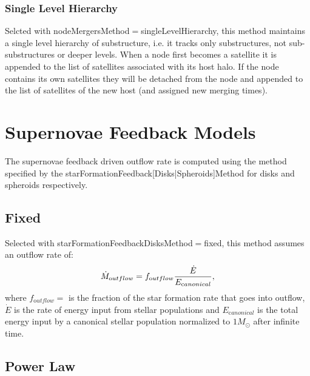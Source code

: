 \subsubsection{Single Level Hierarchy}

Selcted with {\normalfont \ttfamily nodeMergersMethod}$=${\normalfont \ttfamily singleLevelHierarchy}, this method maintains a single level hierarchy of substructure, i.e. it tracks only substructures, not sub-substructures or deeper levels. When a \gls{node} first becomes a satellite it is appended to the list of satellites associated with its host halo. If the \gls{node} contains its own satellites they will be detached from the \gls{node} and appended to the list of satellites of the new host (and assigned new merging times).

\section{Supernovae Feedback Models}\label{sec:sneFeedback}

The supernovae feedback driven outflow rate is computed using the method specified by the {\normalfont \ttfamily starFormationFeedback[Disks|Spheroids]Method} for disks and spheroids respectively.

\subsection{Fixed}

Selected with {\normalfont \ttfamily starFormationFeedbackDisksMethod}$=${\normalfont \ttfamily fixed}, this method assumes an outflow rate of:
\begin{equation}
 \dot{M}_{\mathrm outflow} = f_{\mathrm outflow} {\dot{E} \over E_{\mathrm canonical}},
\end{equation}
where $f_{\mathrm outflow}=${\normalfont \ttfamily [diskOutflowFraction]} is the fraction of the star formation rate that goes into outflow, $\dot{E}$ is the rate of energy input from stellar populations and $E_{\mathrm canonical}$ is the total energy input by a canonical stellar population normalized to $1 M_\odot$ after infinite time.

\subsection{Power Law}

